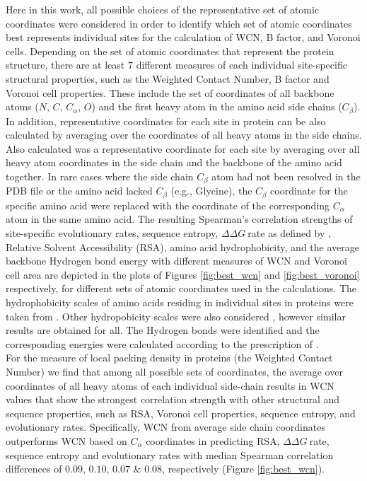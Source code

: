 \documentclass[11pt]{article}
\newcommand{\ddg}{$\Delta\Delta G~$}
\begin{document}
\begin{appendices}
    Here in this work, all possible choices of the representative set of atomic coordinates were considered in order to identify which set of atomic coordinates best represents individual sites for the calculation of WCN, B factor, and Voronoi cells. Depending on the set of atomic coordinates that represent the protein structure, there are at least $7$ different measures of each individual site-specific structural properties, such as the Weighted Contact Number, B factor and Voronoi cell properties. These include the set of coordinates of all backbone atoms ($N$, $C$, $C_\alpha$, $O$) and the first heavy atom in the amino acid side chains ($C_\beta$). In addition, representative coordinates for each site in protein can be also calculated by averaging over the coordinates of all heavy atoms in the side chains. Also calculated was a representative coordinate for each site by averaging over all heavy atom coordinates in the side chain and the backbone of the amino acid together. In rare cases where the side chain $C_\beta$ atom had not been resolved in the PDB file or the amino acid lacked $C_\beta$ (e.g., Glycine), the $C_\beta$ coordinate for the specific amino acid were replaced with the coordinate of the corresponding $C_\alpha$ atom in the same amino acid. The resulting Spearman's correlation strengths of site-specific evolutionary rates, sequence entropy, \ddg rate as defined by \citet{echave_relationship_2014}, Relative Solvent Accessibility (RSA), amino acid hydrophobicity, and the average backbone Hydrogen bond energy with different measures of WCN and Voronoi cell area are depicted in the plots of Figures \ref{fig:best_wcn} and \ref{fig:best_voronoi} respectively, for different sets of atomic coordinates used in the calculations. The hydrophobicity scales of amino acids residing in individual sites in proteins were taken from \cite{hessa_recognition_2005}. Other hydropobicity scales were also considered \cite{wimley_experimentally_1996, kyte_simple_1982}, however similar results are obtained for all. The Hydrogen bonds were identified and the corresponding energies were calculated according to the prescription of \citet{kabsch_dictionary_1983}. \\



    For the measure of local packing density in proteins (the Weighted Contact Number) we find that among all possible sets of coordinates, the average over coordinates of all heavy atoms of each individual side-chain results in WCN values that show the strongest correlation strength with other structural and sequence properties, such as RSA, Voronoi cell properties, sequence entropy, and evolutionary rates. Specifically, WCN from average side chain coordinates outperforms WCN based on $C_\alpha$ coordinates in predicting RSA, \ddg rate, sequence entropy and evolutionary rates with median Spearman correlation differences of $0.09$, $0.10$, $0.07$ \& $0.08$, respectively (Figure \ref{fig:best_wcn}). \\


\end{appendices}
\end{document}
